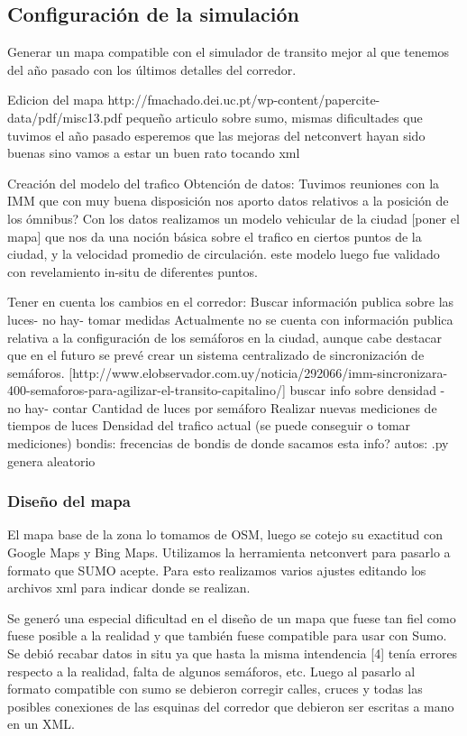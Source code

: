 \subsection{Configuración de la simulación}


Generar un mapa compatible con el simulador de transito mejor al que tenemos del año pasado con los últimos detalles del corredor.

Edicion del mapa http://fmachado.dei.uc.pt/wp-content/papercite-data/pdf/misc13.pdf pequeño articulo sobre sumo, mismas dificultades que tuvimos el año pasado esperemos que las mejoras del netconvert hayan sido buenas sino vamos a estar un buen rato tocando xml

Creación del modelo del trafico
	Obtención de datos: Tuvimos reuniones con la IMM que con muy buena disposición nos aporto datos relativos a la posición de los ómnibus?
	Con los datos realizamos un modelo vehicular de la ciudad [poner el mapa] que nos da una noción básica sobre el trafico en ciertos puntos de la ciudad, y la velocidad promedio de circulación.
	este modelo luego fue validado con revelamiento in-situ de diferentes puntos.

Tener en cuenta los cambios en el corredor:
	Buscar información publica sobre las luces- no hay- tomar medidas 
	Actualmente no se cuenta con información publica relativa a la configuración de los semáforos en la ciudad, aunque cabe destacar que en el futuro se prevé crear un sistema centralizado de sincronización de semáforos.  [http://www.elobservador.com.uy/noticia/292066/imm-sincronizara-400-semaforos-para-agilizar-el-transito-capitalino/] 
	buscar info sobre densidad - no hay- contar
	Cantidad de luces por semáforo
	Realizar nuevas mediciones de tiempos de luces
	Densidad del trafico actual (se puede conseguir o tomar mediciones)
	bondis: frecencias de bondis
	de donde sacamos esta info?
	autos: .py genera aleatorio


\subsubsection{Diseño del mapa}
El mapa base de la zona lo tomamos de OSM, luego se cotejo su exactitud con Google Maps y Bing Maps.
Utilizamos la herramienta netconvert para pasarlo a formato que SUMO acepte. 
Para esto realizamos varios ajustes editando los archivos xml para indicar donde se realizan.

Se generó una especial dificultad en el diseño de un mapa que
fuese tan fiel como fuese posible a la realidad y que también
fuese compatible para usar con  Sumo. Se debió recabar datos
in  situ  ya  que  hasta  la  misma  intendencia  [4]  tenía  errores
respecto a la realidad, falta de algunos semáforos, etc. Luego al
pasarlo  al  formato  compatible  con  sumo  se  debieron  corregir
calles,  cruces  y  todas las  posibles  conexiones de  las  esquinas
del corredor que debieron ser escritas a mano en un XML.

